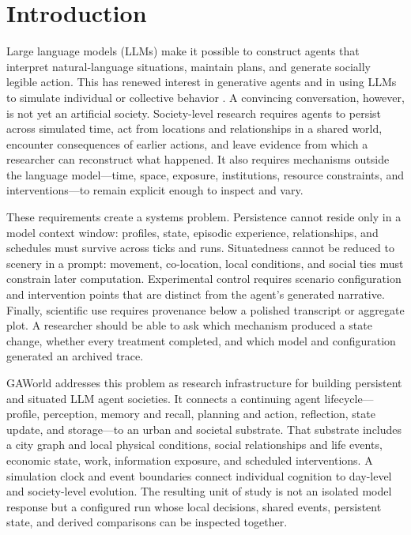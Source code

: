 \section{Introduction}
\label{sec:introduction}

Large language models (LLMs) make it possible to construct agents that
interpret natural-language situations, maintain plans, and generate socially
legible action.  This has renewed interest in generative agents and in using
LLMs to simulate individual or collective behavior
\citep{park2023generative,park2024grounded,argyle2023outofone}.  A convincing
conversation, however, is not yet an artificial society.  Society-level
research requires agents to persist across simulated time, act from locations
and relationships in a shared world, encounter consequences of earlier
actions, and leave evidence from which a researcher can reconstruct what
happened.  It also requires mechanisms outside the language model---time,
space, exposure, institutions, resource constraints, and interventions---to
remain explicit enough to inspect and vary.

These requirements create a systems problem.  Persistence cannot reside only
in a model context window: profiles, state, episodic experience, relationships,
and schedules must survive across ticks and runs.  Situatedness cannot be
reduced to scenery in a prompt: movement, co-location, local conditions, and
social ties must constrain later computation.  Experimental control requires
scenario configuration and intervention points that are distinct from the
agent's generated narrative.  Finally, scientific use requires provenance
below a polished transcript or aggregate plot.  A researcher should be able to
ask which mechanism produced a state change, whether every treatment
completed, and which model and configuration generated an archived trace.

GAWorld addresses this problem as research infrastructure for building
persistent and situated LLM agent societies.  It connects a continuing agent
lifecycle---profile, perception, memory and recall, planning and action,
reflection, state update, and storage---to an urban and societal substrate.
That substrate includes a city graph and local physical conditions, social
relationships and life events, economic state, work, information exposure,
and scheduled interventions.  A simulation clock and event boundaries connect
individual cognition to day-level and society-level evolution.  The resulting
unit of study is not an isolated model response but a configured run whose
local decisions, shared events, persistent state, and derived comparisons can
be inspected together.

